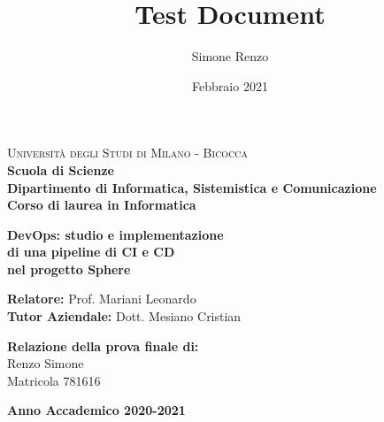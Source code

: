 \documentclass[a4paper,12pt]{report}
\title{Test Document}
\author{Simone Renzo}
\date{Febbraio 2021}
\begin{document}
	
	\begin{titlepage}
		\noindent
		\begin{minipage}[t]{0.19\textwidth}
		\end{minipage}
		\begin{minipage}[t]{0.81\textwidth}
			{
				{\textsc{Università degli Studi di Milano - Bicocca}} \\
				\textbf{Scuola di Scienze} \\
				\textbf{Dipartimento di Informatica, Sistemistica e Comunicazione} \\
				\textbf{Corso di laurea in Informatica} \\
				\par
			}
		\end{minipage}
		
		\vspace{40mm}
		
		\begin{center}
			{\LARGE{
					\textbf{DevOps: studio e implementazione \\ di una pipeline di CI e CD \\ nel progetto Sphere}
					\par
			}}
		\end{center}
		
		\vspace{40mm}
		
		\noindent
		{\large \textbf{Relatore:} Prof. Mariani Leonardo} \\
		
		\noindent
		{\large \textbf{Tutor Aziendale:} Dott. Mesiano Cristian}
		
		\vspace{15mm}
		
		\begin{flushright}
			{\large \textbf{Relazione della prova finale di:}} \\
			\large{Renzo Simone} \\
			\large{Matricola 781616} 
		\end{flushright}
		
		\vspace{40mm}
		\begin{center}
			{\large{\bf Anno Accademico 2020-2021}}
		\end{center}
		
		\restoregeometry
		
	\end{titlepage}
	
\end{document}
